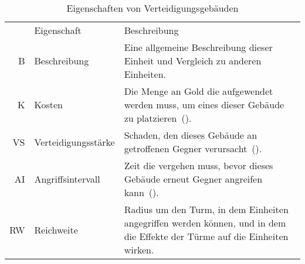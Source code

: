 \begingroup
  \small
  \begin{longtabu}{rlX}
    \rowfont{\normalsize}
    \caption{Eigenschaften von Verteidigungsgebäuden\label{tab:defend-props}}\\

    \midrule[\heavyrulewidth]\rowfont{\itshape}
    & Eigenschaft & Beschreibung \\
    \midrule

    B  & Beschreibung
       & Eine allgemeine Beschreibung dieser Einheit und Vergleich zu anderen
         Einheiten. \\
    K  & Kosten
       & Die Menge an Gold die aufgewendet werden muss, um eines dieser
         Gebäude zu platzieren~(). \\
    VS & Verteidigungsstärke
       & Schaden, den dieses Gebäude an getroffenen Gegner
         verursacht~(). \\
    AI & Angriffsintervall
       & Zeit die vergehen muss, bevor dieses Gebäude erneut Gegner angreifen
         kann~(). \\
    RW & Reichweite
       & Radius um den Turm, in dem Einheiten angegriffen werden können, und in
         dem die Effekte der Türme auf die Einheiten wirken. \\

    \bottomrule
  \end{longtabu}
\endgroup

